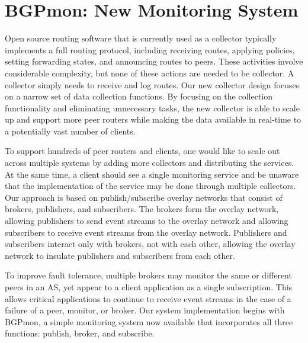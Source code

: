 \section{BGPmon: New Monitoring System}
\label{sec:main}

Open source routing software that is currently used as a collector typically implements a full routing protocol, including receiving routes, applying policies, setting forwarding states, and announcing routes to peers. 
These activities involve considerable complexity, but none of these actions are needed to be collector. 
A collector simply needs to receive and log routes. 
Our new collector design focuses on a narrow set of data collection functions. 
By focusing on the collection functionality and eliminating unnecessary tasks, the new collector is able to scale up and support more peer routers while making the data available in real-time to a potentially vast number of clients. 


To support hundreds of peer routers and clients, one would like to scale out across multiple systems by adding more collectors and distributing the services. 
At the same time, a client should see a single monitoring service and be unaware that the implementation of the service may be done through multiple collectors. 
Our approach is based on publish/subscribe overlay networks that consist of brokers, publishers, and subscribers. 
The brokers form the overlay network, allowing publishers to send event streams to the overlay network and allowing subscribers to receive event streams from the overlay network. 
Publishers and subscribers interact only with brokers, not with each other, allowing the overlay network to insulate publishers and subscribers from each other. 

To improve fault tolerance, multiple brokers may monitor the same or different peers in an AS, yet appear to a client application as a single subscription. 
This allows critical applications to continue to receive event streams in the case of a failure of a peer, monitor, or broker. 
Our system implementation begins with BGPmon, a simple monitoring system now available that incorporates all three functions: publish, broker, and subscribe. 

